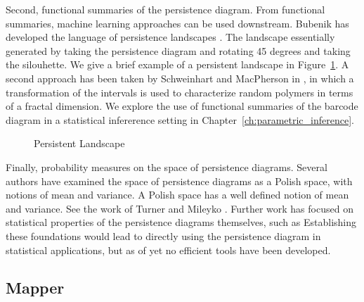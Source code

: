 Second, functional summaries of the persistence diagram.
From functional summaries, machine learning approaches can be used downstream.
Bubenik has developed the language of persistence landscapes \cite{Bubenik:2007ux,Bubenik2015:um}.
The landscape essentially generated by taking the persistence diagram and rotating 45 degrees and taking the silouhette.
We give a brief example of a persistent landscape in Figure~\ref{fig:bg:landscape}.
A second approach has been taken by Schweinhart and MacPherson in \cite{MacPherson:2012eq}, in which a transformation of the intervals is used to characterize random polymers in terms of a fractal dimension.
We explore the use of functional summaries of the barcode diagram in a statistical infererence setting in Chapter~\ref{ch:parametric_inference}.

\begin{figure}
\centering
\caption[Persistent Landscape]{Persistent Landscape}
\label{fig:bg:landscape}
\end{figure}

Finally, probability measures on the space of persistence diagrams.
Several authors have examined the space of persistence diagrams as a Polish space, with notions of mean and variance.
A Polish space has a well defined notion of mean and variance.
See the work of Turner \cite{Turner:2012wb} and Mileyko \cite{Mileyko:2011jm}.
Further work has focused on statistical properties of the persistence diagrams themselves, such as \cite{Chazal:2014vl}
Establishing these foundations would lead to directly using the persistence diagram in statistical applications, but as of yet no efficient tools have been developed.




\subsection{Mapper}
\label{bg:tda:mapper}

